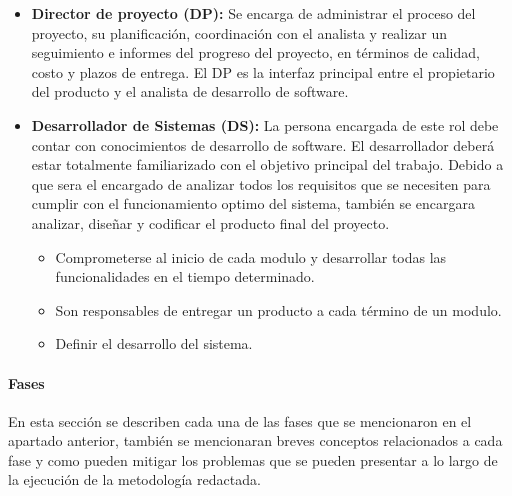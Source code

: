 \begin{itemize}
	\item \textbf{Director de proyecto (DP):} Se encarga de administrar el proceso del proyecto, su planificación, coordinación con el analista y realizar un seguimiento e informes del progreso del proyecto, en términos de calidad, costo y plazos de entrega. El DP es la interfaz principal entre el propietario del producto y el analista de desarrollo de software.
	
	\item \textbf{Desarrollador de Sistemas (DS):} La persona encargada de este rol debe contar con conocimientos de desarrollo de software. El desarrollador deberá estar totalmente familiarizado con el objetivo principal del trabajo. Debido a que sera el encargado de analizar todos los requisitos que se necesiten para cumplir con el funcionamiento optimo del sistema, también se encargara analizar, diseñar y codificar el producto final del proyecto.
	
	\begin{itemize}
		\item Comprometerse al inicio de cada modulo y desarrollar todas las funcionalidades en el tiempo determinado.
		
		\item Son responsables de entregar un producto a cada término de un modulo.
		
		\item Definir el desarrollo del sistema.
	\end{itemize} 
\end{itemize}

\paragraph{Fases}

En esta sección se describen cada una de las fases que se mencionaron en el apartado anterior, también se mencionaran breves conceptos relacionados a cada fase y como pueden mitigar los problemas que se pueden presentar a lo largo de la ejecución de la metodología redactada. 

